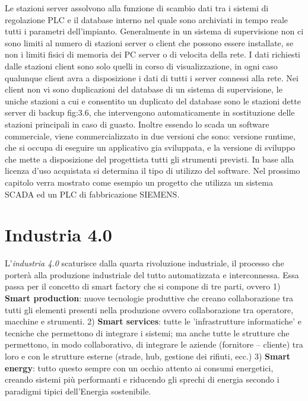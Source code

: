 \documentclass[12pt, a4paper, oneside]{book}
\begin{document}
Le stazioni server assolvono alla funzione di scambio dati tra i sistemi di regolazione PLC e il database interno nel quale sono archiviati in tempo reale tutti i parametri dell’impianto. Generalmente in un sistema di supervisione non ci sono limiti al numero di stazioni server o client che possono essere installate, se non i limiti fisici di memoria dei PC server o di velocita della rete.
I dati richiesti dalle stazioni client sono solo quelli in corso di visualizzazione, in ogni caso qualunque client avra a disposizione i dati di tutti i server connessi alla rete. Nei client non vi sono duplicazioni del database di un sistema di supervisione, le uniche stazioni a cui e consentito un duplicato del database sono le stazioni dette server di backup fig:3.6, che intervengono automaticamente in sostituzione delle stazioni principali in caso di guasto. Inoltre essendo lo scada un software commerciale, viene commercializzato in due versioni che sono: versione runtime, che si occupa di eseguire un applicativo gia sviluppata, e la versione di sviluppo che mette a disposizione del progettista tutti gli strumenti previsti. In base alla licenza d’uso acquistata si determina il tipo di utilizzo del software. Nel prossimo capitolo verra mostrato come esempio un progetto che utilizza un sistema SCADA ed un PLC di fabbricazione SIEMENS.


	\section{Industria 4.0}
L'\textit{industria 4.0} scaturisce dalla quarta rivoluzione industriale, il processo che porterà alla produzione industriale del tutto automatizzata e interconnessa. Essa passa per il concetto di smart factory che si compone di tre parti, ovvero 1) \textbf{Smart production}: nuove tecnologie produttive che creano collaborazione tra tutti gli elementi presenti nella produzione ovvero collaborazione tra operatore, macchine e strumenti. 2) \textbf{Smart services}: tutte le 'infrastrutture informatiche' e tecniche che permettono di integrare i sistemi; ma anche tutte le strutture che permettono, in modo collaborativo, di integrare le aziende (fornitore – cliente) tra loro e con le strutture esterne (strade, hub, gestione dei rifiuti, ecc.) 3) \textbf{Smart energy}: tutto questo sempre con un occhio attento ai consumi energetici, creando sistemi più performanti e riducendo gli sprechi di energia secondo i paradigmi tipici dell'Energia sostenibile.
\end{document}

